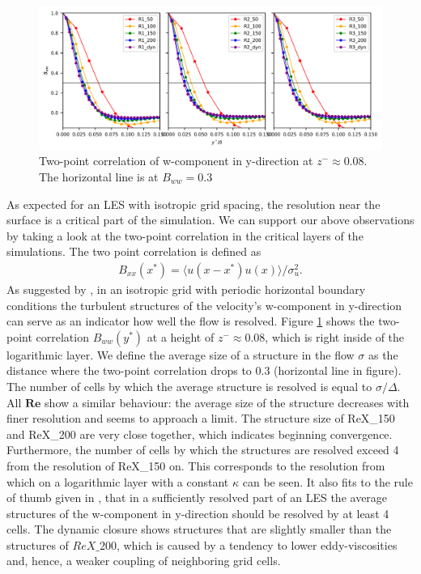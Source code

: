 \documentclass[draft,a4paper,11pt]{article}
\newcommand{\RE}{\mathbf{Re}}
\begin{document}
\begin{figure}[ht]
  \centerline{
	\includegraphics[width=\textwidth]{figures_2024/d3y_2pc_ww_3Re_0.079.png}
}
  \caption{Two-point correlation of w-component in y-direction at $z^-\approx 0.08$. The horizontal line is at $B_{ww}=0.3$}
  \label{2pc_008}
\end{figure}

As expected for an LES with isotropic grid spacing, the resolution near the surface is a critical part of the simulation. We can support our above observations by taking a look at the two-point correlation in the critical layers of the simulations. The two point correlation is defined as 
\begin{align}
  B_{xx}\left(x^*\right) = \langle u\left(x-x^*\right)u\left(x\right)\rangle/\sigma_u^2.
\end{align}
As suggested by \cite{wurps2020grid}, in an isotropic grid with periodic horizontal boundary conditions the turbulent structures of the velocity's w-component in y-direction can serve as an indicator how well the flow is resolved. Figure \ref{2pc_008} shows the two-point correlation $B_{ww}(y^*)$ at a height of $z^-\approx 0.08$, which is right inside of the logarithmic layer. We define the average size of a structure in the flow $\sigma$ as the distance where the two-point correlation drops to 0.3 (horizontal line in figure). The number of cells by which the average structure is resolved is equal to $\sigma/\Delta$. All $\RE$ show a similar behaviour: the average size of the structure decreases with finer resolution and seems to approach a limit. The structure size of ReX\_150 and ReX\_200 are very close together, which indicates beginning convergence. Furthermore, the number of cells by which the structures are resolved exceed 4 from the resolution of ReX\_150 on. This corresponds to the resolution from which on a logarithmic layer with a constant $\kappa$ can be seen. It also fits to the rule of thumb given in \cite{wurps2020grid}, that in a sufficiently resolved part of an LES the average structures of the w-component in y-direction should be resolved by at least 4 cells. The dynamic closure shows structures that are slightly smaller than the structures of $ReX\_200$, which is caused by a tendency to lower eddy-viscosities and, hence, a weaker coupling of neighboring grid cells.
\end{document}
